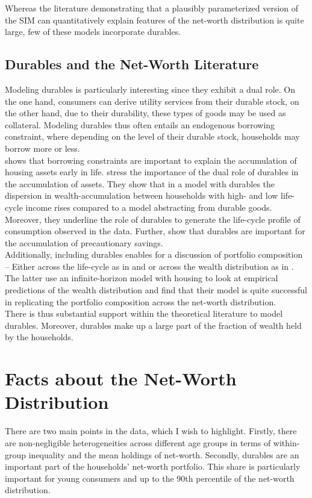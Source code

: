 \documentclass[a4paper,12pt,legno]{article}
\begin{document}
Whereas the literature demonstrating that a plausibly parameterized version of the SIM can quantitatively explain features of the net-worth distribution is quite large, few of these models incorporate durables.

\subsection{Durables and the Net-Worth Literature}

Modeling durables is particularly interesting since they exhibit a dual role. On the one hand, consumers can derive utility services from their durable stock, on the other hand, due to their durability, these types of goods may be used as collateral. Modeling durables thus often entails an endogenous borrowing constraint, where depending on the level of their durable stock, households may borrow more or less. \\
\cite{yang2009} shows that borrowing constraints are important to explain the accumulation of housing assets early in life. \cite{FV&K2011} stress the importance of the dual role of durables in the accumulation of assets. They show that in a model with durables the dispersion in wealth-accumulation between households with high- and low life-cycle income rises compared to a model abstracting from durable goods. Moreover, they underline the role of durables to generate the life-cycle profile of consumption observed in the data. Further, \cite{gruber2003precautionary} show that durables are important for the accumulation of precautionary savings.    
\\
Additionally, including durables enables for a discussion of portfolio composition \--- Either across the life-cycle as in \cite{yang2009} and \cite{FV&K2011} or across the wealth distribution as in \cite{diaz2010}. The latter use an infinite-horizon model with housing to look at empirical predictions of the wealth distribution and find that their model is quite successful in replicating the portfolio composition across the net-worth distribution.
\\
There is thus substantial support within the theoretical literature to model durables. Moreover, durables make up a large part of the fraction of wealth held by the households. 

\section{Facts about the Net-Worth Distribution} \label{facts} There are two main points in the data, which I wish to highlight. Firstly, there are non-negligible heterogeneities across different age groups in terms of within-group inequality and the mean holdings of net-worth. Secondly, durables are an important part of the households' net-worth portfolio. This share is particularly important for young consumers and up to the 90th percentile of the net-worth distribution. 
\end{document}
